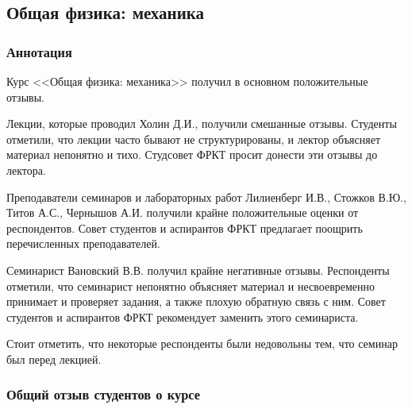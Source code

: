 \subsection{Общая физика: механика}
	
	\subsubsection{Аннотация}

        Курс <<Общая физика: механика>> получил в основном положительные отзывы. 
        
        Лекции, которые проводил Холин Д.И., получили смешанные отзывы. Студенты отметили, что лекции часто бывают не структурированы, и лектор объясняет материал непонятно и тихо. Студсовет ФРКТ просит донести эти отзывы до лектора.

        Преподаватели семинаров и лабораторных работ Лилиенберг И.В., Стожков В.Ю., Титов А.С., Чернышов А.И. получили крайне положительные оценки от респондентов. Совет студентов и аспирантов ФРКТ предлагает поощрить перечисленных преподавателей.

        Семинарист Вановский В.В. получил крайне негативные отзывы. Респонденты отметили, что семинарист непонятно объясняет материал и несвоевременно принимает и проверяет задания, а также плохую обратную связь с ним. Совет студентов и аспирантов ФРКТ рекомендует заменить этого семинариста.

        Стоит отметить, что некоторые респонденты были недовольны тем, что семинар был перед лекцией.
        
	\subsubsection{Общий отзыв студентов о курсе}

